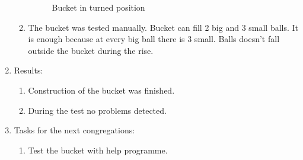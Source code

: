 \begin{enumerate}
\begin{enumerate}
\begin{figure}[H]
\begin{minipage}[h]{0.47\linewidth}
				\caption{Bucket in turned position}
			\end{minipage}
		\end{figure}
		
		
		\item The bucket was tested manually. Bucket can fill 2 big and 3 small balls. It is enough because at every big ball there is 3 small. Balls doesn't fall outside the bucket during the rise.
		
		
	\end{enumerate}
	
	\item Results:
	\begin{enumerate}
		\item Construction of the bucket was finished.
		
		\item During the test no problems detected.
		
	\end{enumerate}
	
	\item Tasks for the next congregations:
	\begin{enumerate}
		\item Test the bucket with help programme.
		
	\end{enumerate}     
\end{enumerate}
\fillpage

